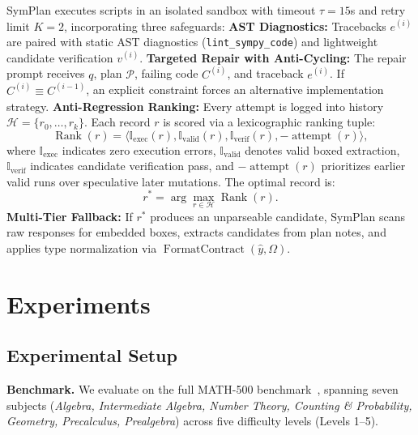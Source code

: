 \documentclass[conference,a4paper]{IEEEtran}
\begin{document}
SymPlan executes scripts in an isolated sandbox with timeout $\tau = 15$s and retry limit $K=2$, incorporating three safeguards:
\textbf{AST Diagnostics:} Tracebacks $e^{(i)}$ are paired with static AST diagnostics (\texttt{lint\_sympy\_code}) and lightweight candidate verification $v^{(i)}$.
\textbf{Targeted Repair with Anti-Cycling:} The repair prompt receives $q$, plan $\mathcal{P}$, failing code $C^{(i)}$, and traceback $e^{(i)}$. If $C^{(i)} \equiv C^{(i-1)}$, an explicit constraint forces an alternative implementation strategy.
\textbf{Anti-Regression Ranking:} Every attempt is logged into history $\mathcal{H} = \{r_0, \ldots, r_k\}$. Each record $r$ is scored via a lexicographic ranking tuple:
\begin{equation}
\operatorname{Rank}(r) = \langle \mathbb{I}_{\text{exec}}(r), \mathbb{I}_{\text{valid}}(r), \mathbb{I}_{\text{verif}}(r), -\operatorname{attempt}(r) \rangle,
\label{eq:ranking}
\end{equation}
where $\mathbb{I}_{\text{exec}}$ indicates zero execution errors, $\mathbb{I}_{\text{valid}}$ denotes valid boxed extraction, $\mathbb{I}_{\text{verif}}$ indicates candidate verification pass, and $-\operatorname{attempt}(r)$ prioritizes earlier valid runs over speculative later mutations. The optimal record is:
\begin{equation}
r^* = \arg\max_{r \in \mathcal{H}} \operatorname{Rank}(r).
\label{eq:select_best}
\end{equation}
\textbf{Multi-Tier Fallback:} If $r^*$ produces an unparseable candidate, SymPlan scans raw responses for embedded boxes, extracts candidates from plan notes, and applies type normalization via $\operatorname{FormatContract}(\hat{y}, \Omega)$.

\section{Experiments}
\label{sec:experiments}

\subsection{Experimental Setup}

\textbf{Benchmark.} We evaluate on the full MATH-500 benchmark~\cite{lightman2024verify,hendrycks2021math}, spanning seven subjects (\textit{Algebra, Intermediate Algebra, Number Theory, Counting \& Probability, Geometry, Precalculus, Prealgebra}) across five difficulty levels (Levels 1--5).
\end{document}
